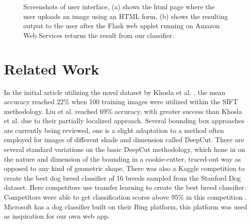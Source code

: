 \documentclass[12pt]{article}
\begin{document}
\begin{figure}[H]
\vspace{1cm}
\caption{Screenshots of user interface, (a) shows the html page where the user uploads an image using an HTML form, (b) shows the resulting output to the user after the Flask web applet running on Amazon Web Services returns the result from our classifier.}
\end{figure}


\section{Related Work}

In the initial article utilizing the novel dataset by Khosla et al. \cite{khosla2011novel}, the mean accuracy reached 22\% when 100 training images were utilized within the SIFT methodology. Liu et al. \cite{liu2012dog} reached 69\% accuracy, with greater success than Khosla et al. \cite{khosla2011novel} due to their partially localized approach. Several bounding box approaches are currently being reviewed, one is a slight adaptation to a method often employed for images of different shade and dimension called DeepCut. \cite{rajchl2016deepcut} There are several standard variations on the basic DeepCut methodology, which hone in on the nature and dimension of the bounding in a cookie-cutter, traced-out way as opposed to any kind of geometric shape. There was also a Kaggle competition to create the best dog breed classifier of 16 breeds sampled from the Stanford Dog dataset. Here competitors use transfer learning to create the best breed classifier. Competitors were able to get classification scores above 95\% in this competition \cite{kaggledogs}. Microsoft has a dog classifier built on their Bing platform, this platform was used as inspiration for our own web app.
\end{document}
